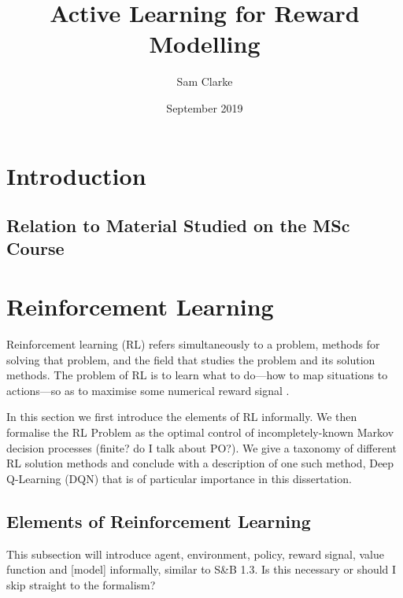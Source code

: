 \documentclass[11pt, a4paper, bibliography=totoc]{report}
\begin{document}
\title{Active Learning for Reward Modelling}
\author{Sam Clarke}
\date{September 2019}
\renewcommand{\bibname}{References}
\maketitle

\begin{abstract} %

\end{abstract}

\tableofcontents

\chapter{Introduction}

\section{Relation to Material Studied on the MSc Course}

\chapter{Reinforcement Learning} %
Reinforcement learning (RL) refers simultaneously to a problem, methods for solving that problem, and the field that studies the problem and its solution methods. The problem of RL is to learn what to do---how to map situations to actions---so as to maximise some numerical reward signal \cite[pp.~1-2]{Sutton2018}.

In this section we first introduce the elements of RL informally. We then formalise the RL Problem as the optimal control of incompletely-known Markov decision processes (finite? do I talk about PO?). We give a taxonomy of different RL solution methods and conclude with a description of one such method, Deep Q-Learning (DQN) that is of particular importance in this dissertation.

\section{Elements of Reinforcement Learning}
This subsection will introduce agent, environment, policy, reward signal, value function and [model] informally, similar to S\&B 1.3. Is this necessary or should I skip straight to the formalism?
\end{document}
